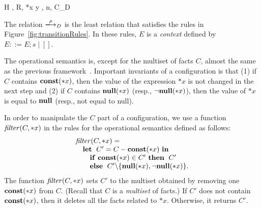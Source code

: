 \begin{figure*}
\begin{minipage}{\textwidth}
{ \langle H , R, *x \leftarrow y , n, C\rangle \xlongrightarrow{}_{D}
  \CONSTEX}



\end{minipage}

\caption{Operational semantics of \(\mathcal{L}\).}
\label{fig:transitionRules}
\end{figure*}

The relation $\xlongrightarrow{\rho}_D$ is the least relation that
satisfies the rules in Figure~\ref{fig:transitionRules}.  In these
rules, $E$ is a \emph{context} defined by $E ::= E;s \mid []$.

The operational semantics is, except for the multiset of facts $C$,
almost the same as the previous framework~\cite{tanPPL2015}.  Important
invariants of a configuration is that (1) if $C$ contains $\mathbf{const}(*x)$,
then the value of the expression $*x$ is not changed in the next step
and (2) if $C$ contains $\mathbf{null}(*x)$ (resp., $\neg\mathbf{null}(*x)$), then the value of
$*x$ is equal to $\mathbf{null}$ (resp., not equal to null).

In order to manipulate the $C$ part of a configuration, we use a
function $\mathit{filter}(C, *x)$ in the rules for the operational semantics
defined as follows:
\[
\begin{array}{l}
 \mathit{filter}(C, *x) =\\
 \quad \mathbf{let}\;\ C' = C - \mathbf{const}(*x)\ \mathbf{in}\;\\
 \quad\quad \mathbf{if}\ \mathbf{const}(*x) \in C'\ \mathbf{then}\;\ C'\\
 \quad\quad \mathbf{else}\;\ C'\backslash\{\mathbf{null}(*x),\neg\mathbf{null}(*x)\}.
\end{array}
\]
The function $\mathit{filter}(C, *x)$ sets $C'$ to the multiset obtained by
removing one $\mathbf{const}(*x)$ from $C$.  (Recall that $C$ is a
\emph{multiset} of facts.)  If $C'$ does not contain $\mathbf{const}(*x)$, then
it deletes all the facts related to $*x$.  Otherwise, it returns $C'$.

